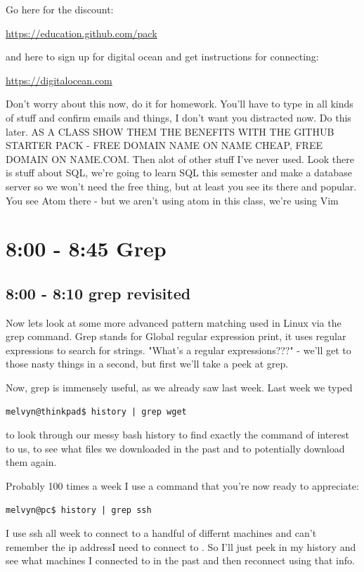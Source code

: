 \documentclass[10pt]{article}
\begin{document}
Go here for the discount:

\url{https://education.github.com/pack}

and here to sign up for digital ocean and get instructions for connecting:

\url{https://digitalocean.com}

{\LARGE Don't worry about this now, do it for homework. You'll have to type in
all kinds of stuff and confirm emails and things, I don't want you distracted
now. Do this later. AS A CLASS SHOW THEM THE BENEFITS WITH THE GITHUB STARTER
PACK - FREE DOMAIN NAME ON NAME CHEAP, FREE DOMAIN ON NAME.COM. Then alot of
other stuff I've never used. Look there is stuff about SQL, we're going to learn
SQL this semester and make a database server so we won't need the free thing,
but at least you see its there and popular. You see Atom there - but we aren't
using atom in this class, we're using Vim}


\section{8:00 - 8:45 Grep}
\subsection{8:00 - 8:10 grep revisited}
Now lets look at some more advanced pattern matching used in Linux via the grep command. 
Grep stands for Global regular expression print, it uses regular expressions to search for strings. "What's a regular expressions???" - we'll get to those nasty things in a second, but first we'll take a peek at grep.

Now, grep is immensely useful, as we already saw last week. Last week we typed

\begin{lstlisting}[style=term]
melvyn@thinkpad$ history | grep wget
\end{lstlisting}

to look through our messy bash history to find exactly the command of interest to us, to see what files we downloaded in the past and to potentially download them again.

Probably  100 times a week I use a command that you're now ready to appreciate:

\begin{lstlisting}
melvyn@pc$ history | grep ssh
\end{lstlisting}

I use ssh all week to connect to a handful of differnt machines and can't
remember the ip addressI need to connect to . So I'll just peek in my history
and see what machines I connected to in the past and then reconnect using that
info.
\end{document}
